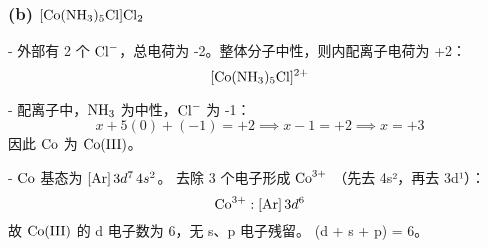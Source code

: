 \documentclass[12pt]{article}
\begin{document}
	\subsubsection*{(b) \(\ce{[Co(NH3)5Cl]Cl2}\)}
	
	- 外部有 2 个 \(\ce{Cl^-}\)，总电荷为 -2。整体分子中性，则内配离子电荷为 +2：
	\[
	[\ce{Co(NH3)5Cl}]^{2+}
	\]
	
	- 配离子中，\(\ce{NH3}\) 为中性，\(\ce{Cl^-}\) 为 -1：  
	\[
	x + 5(0) + (-1) = +2 \implies x - 1 = +2 \implies x = +3
	\]
	因此 \(\ce{Co}\) 为 \(\ce{Co(III)}\)。
	
	- \(\ce{Co}\) 基态为 \([ \ce{Ar}]\,3d^7\,4s^2\)。  
	去除 3 个电子形成 \(\ce{Co^{3+}}\) （先去 4s²，再去 3d¹）：  
	\[
	\ce{Co^{3+}}: [\ce{Ar}]\,3d^6
	\]
	故 \(\ce{Co(III)}\) 的 d 电子数为 6，无 s、p 电子残留。  
	(d + s + p) = 6。
	
	
	
\end{document}
